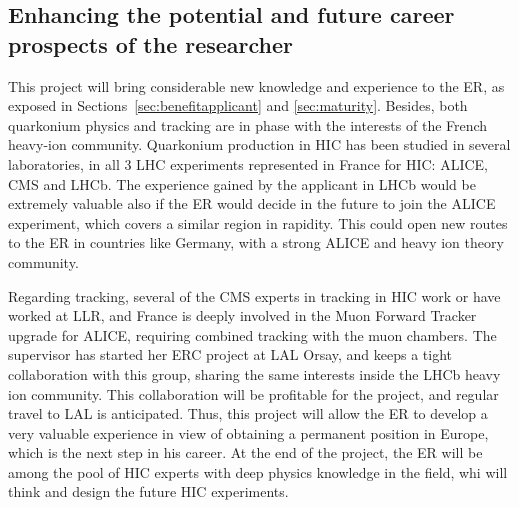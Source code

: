 \documentclass[a4paper,11pt]{article}
\newcommand{\ER}{ER\xspace}
\newcommand{\Supervisor}{The supervisor\xspace}
\begin{document}
%               

\subsection{Enhancing the potential and future career prospects of the researcher }
\label{sec:enhancement}

This project will bring considerable new knowledge and experience to the \ER, as exposed in Sections~\ref{sec:benefitapplicant} and \ref{sec:maturity}. Besides, both quarkonium physics and tracking are in phase with the interests of the French heavy-ion community. Quarkonium production in HIC has been studied in several laboratories, in all 3 LHC experiments represented in France for HIC: ALICE, CMS and LHCb. 
The experience gained by the applicant in LHCb would be extremely valuable
also if the \ER would decide in the future to join the ALICE experiment, which 
covers a similar region in rapidity. This could open new routes to the \ER 
in countries like Germany, with a strong ALICE and heavy ion theory community.

Regarding tracking, several of the CMS experts in tracking in HIC work or have worked at LLR, and France is deeply involved in the Muon Forward Tracker upgrade for ALICE, requiring combined tracking with the muon chambers. \Supervisor has started her ERC project at LAL Orsay, and keeps a tight collaboration with this group, sharing the same interests inside the LHCb heavy ion community. This collaboration will be profitable for the project, and regular travel to LAL is anticipated. Thus, this project will allow the \ER to develop a very valuable experience in view of obtaining a permanent position in Europe, which is the next step in his career. At the end of the project, the \ER will be among the pool of HIC experts with deep physics knowledge in the field, whi will think and design the future HIC experiments.




%                
\end{document}
